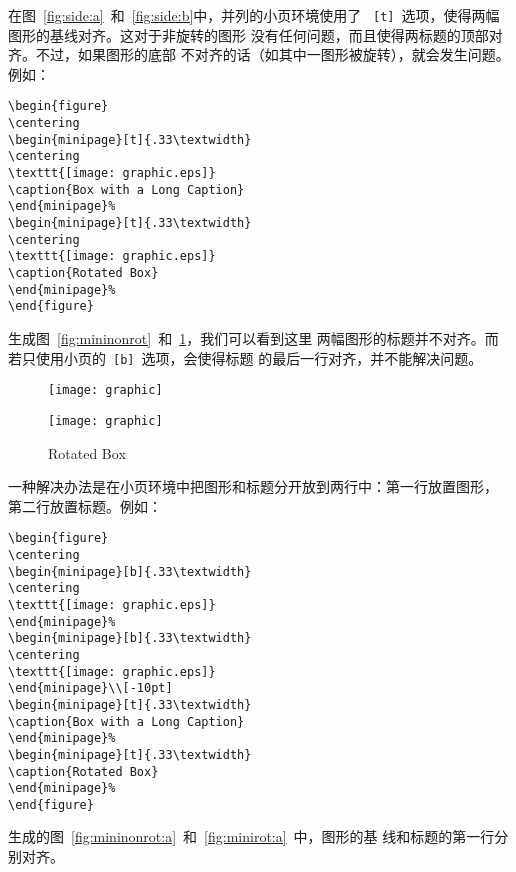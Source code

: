 在图~\ref{fig:side:a}~和~\ref{fig:side:b}中，并列的小页环境使用了
~\texttt{[t]}~选项，使得两幅图形的基线对齐。这对于非旋转的图形
没有任何问题，而且使得两标题的顶部对齐。不过，如果图形的底部
不对齐的话（如其中一图形被旋转），就会发生问题。例如：
\begin{Verbatim}[xleftmargin=1cm]
\begin{figure} 
\centering 
\begin{minipage}[t]{.33\textwidth} 
\centering 
\texttt{[image: graphic.eps]} 
\caption{Box with a Long Caption} 
\end{minipage}% 
\begin{minipage}[t]{.33\textwidth} 
\centering 
\texttt{[image: graphic.eps]} 
\caption{Rotated Box} 
\end{minipage}% 
\end{figure}
\end{Verbatim}
生成图~\ref{fig:mininonrot}~和~\ref{fig:minirot}，我们可以看到这里
两幅图形的标题并不对齐。而若只使用小页的~\texttt{[b]}~选项，会使得标题
的最后一行对齐，并不能解决问题。

\begin{figure} 
	\centering 
	\begin{minipage}[t]{.33\textwidth} 
		\centering 
		\texttt{[image: graphic]} 
		\caption{Box with a Long Caption}\label{fig:mininonrot} 
	\end{minipage}%
	\begin{minipage}[t]{.33\textwidth} 
		\centering 
		\texttt{[image: graphic]} 
		\caption{Rotated Box}\label{fig:minirot} 
	\end{minipage}%
\end{figure}

一种解决办法是在小页环境中把图形和标题分开放到两行中：第一行放置图形，
第二行放置标题。例如：
\begin{Verbatim}[xleftmargin=1cm]
\begin{figure} 
\centering 
\begin{minipage}[b]{.33\textwidth} 
\centering 
\texttt{[image: graphic.eps]} 
\end{minipage}% 
\begin{minipage}[b]{.33\textwidth} 
\centering 
\texttt{[image: graphic.eps]} 
\end{minipage}\\[-10pt] 
\begin{minipage}[t]{.33\textwidth} 
\caption{Box with a Long Caption} 
\end{minipage}% 
\begin{minipage}[t]{.33\textwidth} 
\caption{Rotated Box} 
\end{minipage}% 
\end{figure}
\end{Verbatim}
生成的图~\ref{fig:mininonrot:a}~和~\ref{fig:minirot:a}~中，图形的基
线和标题的第一行分别对齐。

